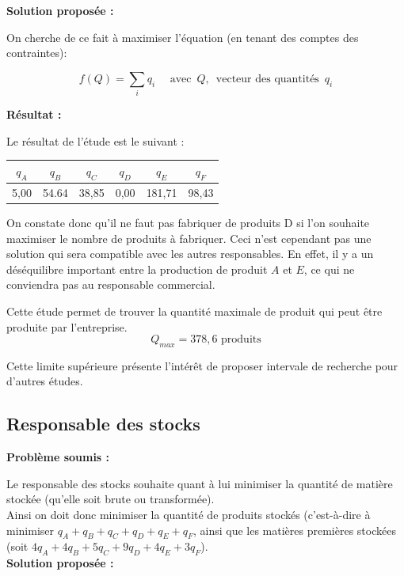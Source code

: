 \documentclass[paper=a4, fontsize=11pt]{scrartcl}
\numberwithin{equation}{section}		%
\numberwithin{figure}{section}			%
\numberwithin{table}{section}				%
\renewcommand{\bf}[1]{\textbf{#1}}
\begin{document}
\bf{Solution proposée :}

On cherche de ce fait à maximiser l'équation (en tenant des comptes des contraintes):

\[f(Q) = \sum_i q_i \quad \text{  avec } \, Q, \, \text{ vecteur des quantités } \, q_i \]

\bf{Résultat :}

Le résultat de l'étude est le suivant : 

\begin{center}
\begin{tabular}{cccccc}
\hline 
$q_A$ & $q_B$ & $q_C$ & $q_D$ & $q_E$ & $q_F$ \\ 
\hline 
5,00 & 54.64 & 38,85 & 0,00 & 181,71 & 98,43 \\ 
\hline 
\end{tabular} 
\end{center}

On constate donc qu'il ne faut pas fabriquer de produits D si l'on souhaite maximiser le nombre de produits à fabriquer. Ceci n'est cependant pas une solution qui sera compatible avec les autres responsables. En effet, il y a un déséquilibre important entre la production de produit $A$ et $E$, ce qui ne conviendra pas au responsable commercial.

Cette étude permet de trouver la quantité maximale de produit qui peut être produite par l'entreprise.
\[ Q_{max} = 378,6 \text{ produits}\]

Cette limite supérieure présente l'intérêt de proposer intervale de recherche pour d'autres études.


\subsection{Responsable des stocks}
\bf{Problème soumis :}

Le responsable des stocks souhaite quant à lui minimiser la quantité de matière stockée (qu'elle soit brute ou transformée).\\

Ainsi on doit donc minimiser la quantité de produits stockés (c'est-à-dire à minimiser $q_A + q_B + q_C + q_D + q_E + q_F$, ainsi que les matières premières stockées (soit $4q_A + 4q_B + 5q_C + 9q_D + 4q_E + 3q_F$).
\\

\bf{Solution proposée :}
\end{document}
